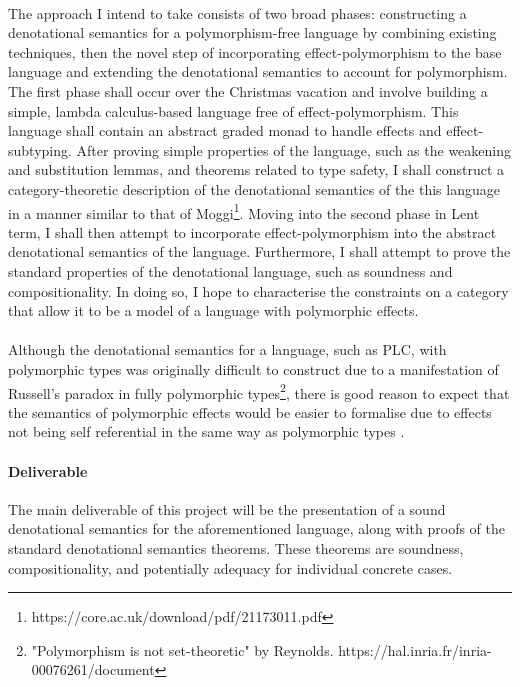 \documentclass[11pt]{article}
\begin{document}
\paragraph{}{
The approach I intend to take consists of two broad phases: constructing a denotational semantics for a polymorphism-free language by combining existing techniques, then the novel step of incorporating effect-polymorphism to the base language and extending the denotational semantics to account for polymorphism. The first phase shall occur over the Christmas vacation and involve building a simple, lambda calculus-based language free of effect-polymorphism. This language shall contain an abstract graded monad to handle effects and effect-subtyping. After proving simple properties of the language, such as the weakening and substitution lemmas, and theorems related to type safety, I shall construct a category-theoretic description of the denotational semantics of the this language in a manner similar to that of Moggi\footnote{https://core.ac.uk/download/pdf/21173011.pdf}. Moving into the second phase in Lent term, I shall then attempt to incorporate effect-polymorphism into the abstract denotational semantics of the language. Furthermore, I shall attempt to prove the standard properties of the denotational language, such as soundness and compositionality. In doing so, I hope to characterise the constraints on a category that allow it to be a model of a language with polymorphic effects.
}

\paragraph{}{
Although the denotational semantics for a language, such as PLC, with polymorphic types was originally difficult to construct due to a manifestation of Russell's paradox in fully polymorphic types\footnote{"Polymorphism
is not set-theoretic" by Reynolds. https://hal.inria.fr/inria-00076261/document}, there is good reason to expect that the semantics of polymorphic effects would be easier to formalise due to effects not being self referential in the same way as polymorphic types .
}




\paragraph{Deliverable}{
The main deliverable of this project will be the presentation of a sound denotational semantics for the aforementioned language, along with proofs of the standard denotational semantics theorems. These theorems are soundness, compositionality, and potentially adequacy for individual concrete cases.
}
\end{document}
